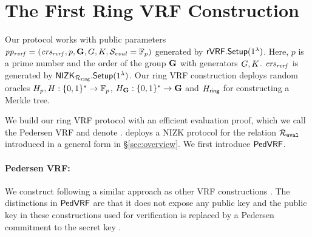 
\def\tmpaux{\aux \doubleplus \piring \doubleplus \comring}
\def\tmpeprintaux{\eprint{\aux'}{\tmpaux}}
\def\tmpindent{\hspace*{5pt}}
\section{The First Ring VRF Construction}%
\label{sec:pederson_vrf}



Our  protocol works with public parameters $ \mathit{pp_{\mathit{rvrf}}} = (\mathit{crs_{\mathit{rvrf}}}, p,{\mathbf{G}}, G,K, {\mathcal{S}}_{eval}  = \mathbb{F}_p)$ generated by $ {\mathsf{rVRF}}.{\mathsf{Setup}}(1^\lambda) $. Here, $ p $ is a prime number and the order of the group $ {\mathbf{G}} $ with generators $ G,K $.  $ \mathit{crs_{\mathit{rvrf}}} $ is  generated by $ {\mathsf{NIZK}}_{\mathcal{R}_{\mathtt{ring}}}.{\mathsf{Setup}}(1^\lambda) $. Our ring VRF construction deploys random oracles $H_p,H: \{0,1\}^* \to \mathbb{F}_p$, $H_{{\mathbf{G}}}: \{0,1\}^* \to {\mathbf{G}}$ and $ H_{\mathsf{ring}} $ for constructing a Merkle tree.

We build our  ring VRF protocol with an efficient evaluation proof, which
we call the Pedersen VRF and denote \PedVRF.
\PedVRF deploys a NIZK protocol for the relation $\mathcal{R}_{\mathtt{eval}}$ introduced in a general form 
in \S\ref{sec:overview}.  We first introduce $ {\mathsf{PedVRF}} $.




\paragraph{Pedersen VRF:} 
We construct \PedVRF following a similar approach as  other VRF constructions
\cite{nsec5,VXEd25519,draft-irtf-cfrg-vrf-10}. The distinctions in $ {\mathsf{PedVRF}} $ are that it does not expose any public key and the public key in these constructions used for verification is replaced  by a Pedersen commitment to the secret key \sk.

